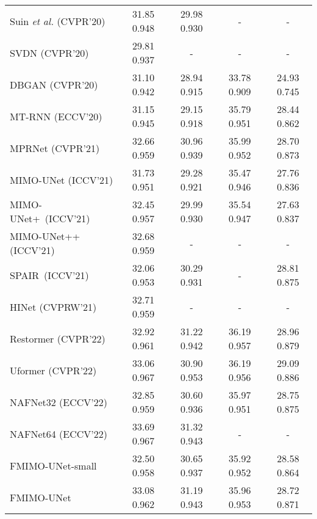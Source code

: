 \documentclass[letterpaper]{article} \usepackage{aaai23}  \usepackage{times}  \usepackage{helvet}  \usepackage{courier}  \usepackage[hyphens]{url}  \usepackage{graphicx} \usepackage{enumitem}
\begin{document}
\begin{table}[!t]
\begin{center}
{\begin{tabular}{l c | c | c | c }
Suin \emph{et al.} (CVPR'20) & 31.85 \colorbox{color4}{0.948} & 29.98 \colorbox{color4}{0.930} & -       & - \\
SVDN (CVPR'20) & 29.81 \colorbox{color4}{0.937} & - & - & -\\
DBGAN (CVPR'20) & 31.10 \colorbox{color4}{0.942} & 28.94 \colorbox{color4}{0.915}  & 33.78 \colorbox{color4}{0.909}     & 24.93 \colorbox{color4}{0.745} \\
MT-RNN (ECCV'20) & 31.15 \colorbox{color4}{0.945} & 29.15 \colorbox{color4}{0.918}   & 35.79 \colorbox{color4}{0.951}     & 28.44 \colorbox{color4}{0.862}\\
MPRNet (CVPR'21) & 32.66 \colorbox{color4}{0.959} & {30.96} \colorbox{color4}{0.939} & {35.99} \colorbox{color4}{0.952} & {28.70} \colorbox{color4}{0.873}\\
MIMO-UNet (ICCV'21) & 31.73 \colorbox{color4}{0.951} & 29.28 \colorbox{color4}{0.921} & 35.47 \colorbox{color4}{0.946}& 27.76 \colorbox{color4}{0.836}\\
MIMO-UNet+~(ICCV'21) & 32.45 \colorbox{color4}{0.957} & 29.99 \colorbox{color4}{0.930} & 35.54 \colorbox{color4}{0.947} & 27.63 \colorbox{color4}{0.837}\\
\small{MIMO-UNet++ (ICCV'21)} & 32.68 \colorbox{color4}{0.959} & - & - & -\\
SPAIR~(ICCV'21) & 32.06 \colorbox{color4}{0.953} & 30.29 \colorbox{color4}{0.931} & - & {28.81} \colorbox{color4}{{0.875}}\\
HINet (CVPRW'21) & {32.71} \colorbox{color4}{0.959} & - & - & -\\
Restormer (CVPR'22) & {32.92} \colorbox{color4}{{0.961}} & {31.22} \colorbox{color4}{{0.942}} & {36.19} \colorbox{color4}{{0.957}} & {28.96} \colorbox{color4}{{0.879}}\\
Uformer (CVPR'22) & 33.06 \colorbox{color4}{0.967} & 30.90 \colorbox{color4}{0.953} & 36.19 \colorbox{color4}{0.956} & 29.09 \colorbox{color4}{0.886}\\
NAFNet32 (ECCV'22) & 32.85 \colorbox{color4}{0.959} & 30.60 \colorbox{color4}{0.936} & 35.97 \colorbox{color4}{0.951} & 28.75 \colorbox{color4}{0.875}\\
NAFNet64 (ECCV'22) & 33.69 \colorbox{color4}{0.967} &31.32  \colorbox{color4}{0.943} & - & - \\
\arrayrulecolor{black!30}\midrule
FMIMO-UNet-small & 32.50 \colorbox{color4}{0.958} & 30.65 \colorbox{color4}{0.937} & 35.92 \colorbox{color4}{0.952} & 28.58 \colorbox{color4}{0.864}\\
FMIMO-UNet & 33.08 \colorbox{color4}{0.962} & 31.19 \colorbox{color4}{0.943} & 35.96 \colorbox{color4}{0.953} & 28.72 \colorbox{color4}{0.871}\\

\end{tabular}}
\end{center}
\end{table}
\end{document}
